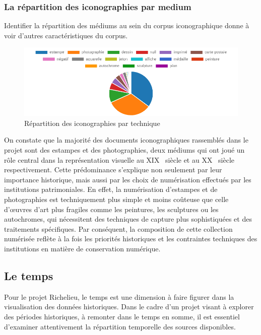 \subsubsection{La répartition des iconographies par medium}
Identifier la répartition des médiums au sein du corpus iconographique donne à voir d'autres caractéristiques du corpus.

\begin{figure}[ht!]
    \centering
    \includegraphics[width=1\linewidth]{images/graphiques/nb_icono_technique>10.png}
    \caption{Répartition des iconographies par technique}
    \label{fig:icono_technique}
\end{figure}

On constate que la majorité des documents iconographiques rassemblés dans le projet sont des estampes et des photographies, deux médiums qui ont joué un rôle central dans la représentation visuelle au XIX\ieme~ siècle et au XX\ieme~ siècle respectivement. Cette prédominance s'explique non seulement par leur importance historique, mais aussi par les choix de numérisation effectués par les institutions patrimoniales. En effet, la numérisation d'estampes et de photographies est techniquement plus simple et moins coûteuse que celle d'œuvres d'art plus fragiles comme les peintures, les sculptures ou les autochromes, qui nécessitent des techniques de capture plus sophistiquées et des traitements spécifiques. Par conséquent, la composition de cette collection numérisée reflète à la fois les priorités historiques et les contraintes techniques des institutions en matière de conservation numérique.

\subsection{Le temps}
Pour le projet Richelieu, le temps est une dimension à faire figurer dans la visualisation des données historiques. Dans le cadre d'un projet visant à explorer des périodes historiques, à remonter dans le temps en somme, il est essentiel d'examiner attentivement la répartition temporelle des sources disponibles.

